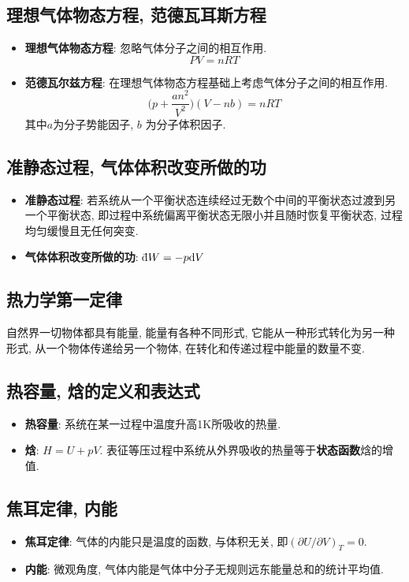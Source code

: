 \subsection{理想气体物态方程, 范德瓦耳斯方程}
\begin{itemize}
\item \textbf{理想气体物态方程}: 忽略气体分子之间的相互作用.
\[
PV=nRT
\] 

\item \textbf{范德瓦尔兹方程}: 在理想气体物态方程基础上考虑气体分子之间的相互作用.
\[
\bigg(p+\frac{an^2}{V^2}\bigg)(V-nb) = nRT
\]
其中$a$为分子势能因子, $b$ 为分子体积因子.

\end{itemize}


\subsection{准静态过程, 气体体积改变所做的功}
\begin{itemize}
\item \textbf{准静态过程}: 若系统从一个平衡状态连续经过无数个中间的平衡状态过渡到另一个平衡状态, 即过程中系统偏离平衡状态无限小并且随时恢复平衡状态, 过程均匀缓慢且无任何突变.

\item \textbf{气体体积改变所做的功}: $\dbar  W = -p \d V$
\end{itemize}

\subsection{热力学第一定律}
自然界一切物体都具有能量, 能量有各种不同形式, 它能从一种形式转化为另一种形式, 从一个物体传递给另一个物体, 在转化和传递过程中能量的数量不变.
\subsection{热容量, 焓的定义和表达式}
\begin{itemize}
\item \textbf{热容量}: 系统在某一过程中温度升高1K所吸收的热量.
\item \textbf{焓}: $H =U + pV$. 表征等压过程中系统从外界吸收的热量等于\textbf{状态函数}焓的增值.
\end{itemize}


\subsection{焦耳定律, 内能}
\begin{itemize}
\item \textbf{焦耳定律}: 气体的内能只是温度的函数, 与体积无关, 即$(\partial U/\partial V)_T = 0$.
\item \textbf{内能}: 微观角度, 气体内能是气体中分子无规则远东能量总和的统计平均值.
\end{itemize}

